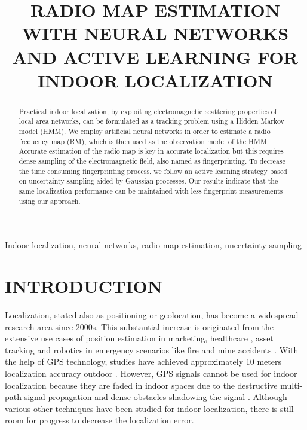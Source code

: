 \documentclass{article}
\title{RADIO MAP ESTIMATION WITH NEURAL NETWORKS AND ACTIVE LEARNING FOR INDOOR LOCALIZATION}
\begin{document}
	\maketitle
	\begin{abstract}
		Practical indoor localization, by exploiting electromagnetic scattering properties of local area networks, can be formulated as a tracking problem using a Hidden Markov model (HMM). We employ artificial neural networks in order to estimate a radio frequency map (RM), which is then used as the observation model of the HMM. Accurate estimation of the radio map is key in accurate localization but this requires dense sampling of the electromagnetic field, also named as fingerprinting. To decrease the time consuming fingerprinting process, we follow an active learning strategy based on uncertainty sampling aided by Gaussian processes. Our results indicate that the same localization performance can be maintained with less fingerprint measurements using our approach.
	\end{abstract}
	\begin{keywords}
		Indoor localization, neural networks, radio map estimation, uncertainty sampling
	\end{keywords}
	\section{INTRODUCTION}
	\label{sec:intro}
	Localization, stated also as positioning or geolocation, has become a widespread research area since 2000s. This substantial increase is originated from the extensive use cases of position estimation in marketing, healthcare \cite{Cal2015}, asset tracking and robotics in emergency scenarios like fire and mine accidents \cite{Zha2009}. With the help of GPS technology, studies have achieved approximately 10 meters localization accuracy outdoor \cite{Dju2001}. However, GPS signals cannot be used for indoor localization because they are faded in indoor spaces due to the destructive multi-path signal propagation and dense obstacles shadowing the signal \cite{bah2000,Bat2002}. Although various other techniques have been studied for indoor localization, there is still room for progress to decrease the localization error. 
	
\end{document}
